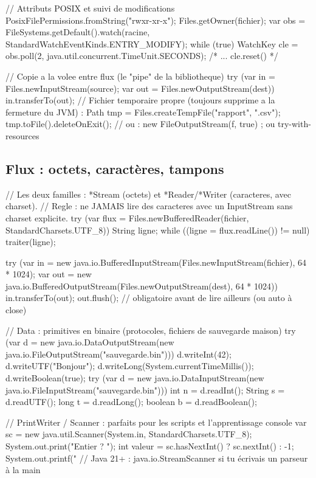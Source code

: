 \begin{codejava}
// Attributs POSIX et suivi de modifications
PosixFilePermissions.fromString("rwxr-xr-x");
Files.getOwner(fichier);
var obs = FileSystems.getDefault().watch(racine, StandardWatchEventKinds.ENTRY_MODIFY);
while (true) { WatchKey cle = obs.poll(2, java.util.concurrent.TimeUnit.SECONDS); /* ... cle.reset() */ }

// Copie a la volee entre flux (le "pipe" de la bibliotheque)
try (var in = Files.newInputStream(source); var out = Files.newOutputStream(dest)) {
    in.transferTo(out);
}
// Fichier temporaire propre (toujours supprime a la fermeture du JVM) :
Path tmp = Files.createTempFile("rapport", ".csv");
tmp.toFile().deleteOnExit();     // ou : new FileOutputStream(f, true) ; ou try-with-resources
\end{codejava}

\subsection{Flux : octets, caract\`eres, tampons}

\begin{codejava}
// Les deux familles : *Stream (octets) et *Reader/*Writer (caracteres, avec charset).
// Regle : ne JAMAIS lire des caracteres avec un InputStream sans charset explicite.
try (var flux = Files.newBufferedReader(fichier, StandardCharsets.UTF_8)) {
    String ligne;
    while ((ligne = flux.readLine()) != null) { traiter(ligne); }
}

try (var in = new java.io.BufferedInputStream(Files.newInputStream(fichier), 64 * 1024);
     var out = new java.io.BufferedOutputStream(Files.newOutputStream(dest), 64 * 1024)) {
    in.transferTo(out);
    out.flush();                                   // obligatoire avant de lire ailleurs (ou auto \`a close)
}

// Data : primitives en binaire (protocoles, fichiers de sauvegarde maison)
try (var d = new java.io.DataOutputStream(new java.io.FileOutputStream("sauvegarde.bin"))) {
    d.writeInt(42); d.writeUTF("Bonjour"); d.writeLong(System.currentTimeMillis()); d.writeBoolean(true);
}
try (var d = new java.io.DataInputStream(new java.io.FileInputStream("sauvegarde.bin"))) {
    int n = d.readInt(); String s = d.readUTF(); long t = d.readLong(); boolean b = d.readBoolean();
}

// PrintWriter / Scanner : parfaits pour les scripts et l'apprentissage console
var sc = new java.util.Scanner(System.in, StandardCharsets.UTF_8);
System.out.print("Entier ? "); int valeur = sc.hasNextInt() ? sc.nextInt() : -1;
System.out.printf("%
// Java 21+ : java.io.StreamScanner si tu \'ecrivais un parseur \`a la main
\end{codejava}


